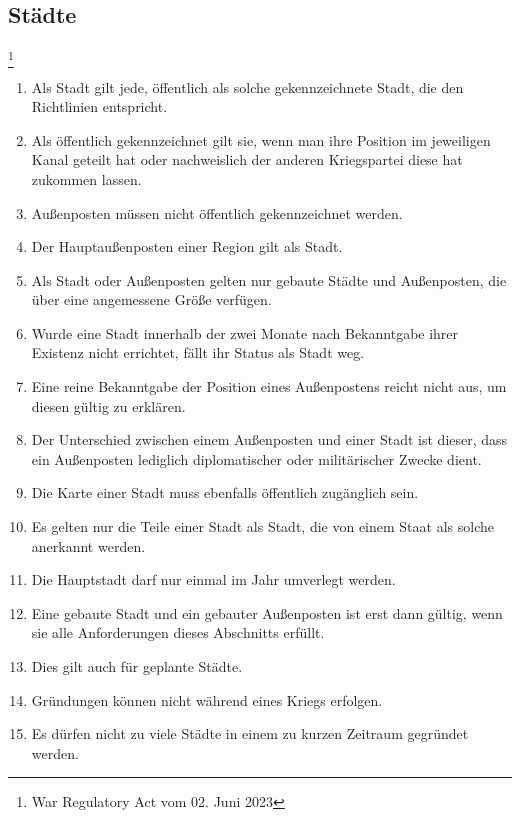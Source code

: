 \documentclass{article}
\begin{document}
\subsection{Städte}\footnote{War Regulatory Act vom 02. Juni 2023}
\begin{enumerate}[(1)]
	\item Als Stadt gilt jede, öffentlich als solche gekennzeichnete Stadt, die den Richtlinien entspricht.
	\item Als öffentlich gekennzeichnet gilt sie, wenn man ihre Position im jeweiligen Kanal geteilt hat oder nachweislich der anderen Kriegspartei diese hat zukommen lassen.
	\item Außenposten müssen nicht öffentlich gekennzeichnet werden.
	\item Der Hauptaußenposten einer Region gilt als Stadt.
	\item Als Stadt oder Außenposten gelten nur gebaute Städte und Außenposten, die über eine angemessene Größe verfügen.
	\item Wurde eine Stadt innerhalb der zwei Monate nach Bekanntgabe ihrer Existenz nicht errichtet, fällt ihr Status als Stadt weg.
	\item Eine reine Bekanntgabe der Position eines Außenpostens reicht nicht aus, um diesen gültig zu erklären.
	\item Der Unterschied zwischen einem Außenposten und einer Stadt ist dieser, dass ein Außenposten lediglich diplomatischer oder militärischer Zwecke dient.
	\item Die Karte einer Stadt muss ebenfalls öffentlich zugänglich sein.
	\item Es gelten nur die Teile einer Stadt als Stadt, die von einem Staat als solche anerkannt werden.
	\item Die Hauptstadt darf nur einmal im Jahr umverlegt werden.
	\item Eine gebaute Stadt und ein gebauter Außenposten ist erst dann gültig, wenn sie alle Anforderungen dieses Abschnitts erfüllt.
	\item Dies gilt auch für geplante Städte.
	\item Gründungen können nicht während eines Kriegs erfolgen.
	\item Es dürfen nicht zu viele Städte in einem zu kurzen Zeitraum gegründet werden.
\end{enumerate}
\end{document}
